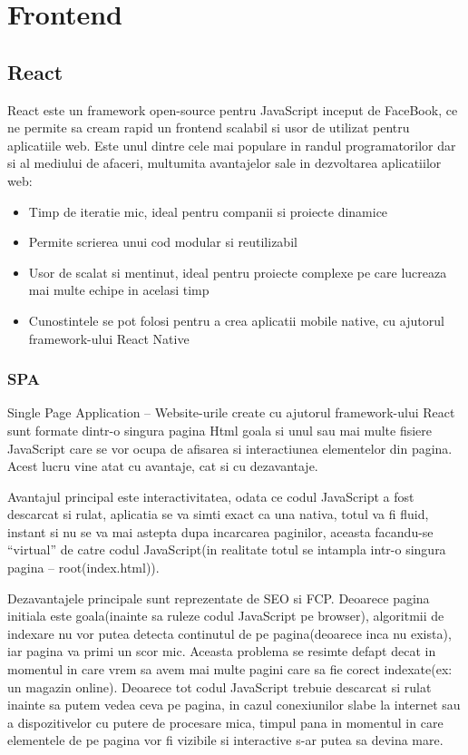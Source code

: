 \documentclass[12pt, a4paper, oneside, romanian]{teza-upb}
\begin{document}
\section{Frontend}

\subsection{React}

React este un framework open-source pentru JavaScript inceput de FaceBook, ce ne permite sa cream rapid un frontend scalabil si usor de utilizat pentru aplicatiile web. Este unul dintre cele mai populare in randul programatorilor dar si al mediului de afaceri, multumita avantajelor sale in dezvoltarea aplicatiilor web\cite{rowebreact}:

\begin{itemize}
	\item Timp de iteratie mic, ideal pentru companii si proiecte dinamice
	\item Permite scrierea unui cod modular si reutilizabil
	\item Usor de scalat si mentinut, ideal pentru proiecte complexe pe care lucreaza mai multe echipe in acelasi timp
	\item Cunostintele se pot folosi pentru a crea aplicatii mobile native, cu ajutorul framework-ului React Native
\end{itemize}

\subsubsection{SPA}

Single Page Application -- Website-urile create cu ajutorul framework-ului React sunt formate dintr-o singura pagina Html goala si unul sau mai multe fisiere JavaScript care se vor ocupa de afisarea si interactiunea elementelor din pagina. Acest lucru vine atat cu avantaje, cat si cu dezavantaje.

Avantajul principal este interactivitatea, odata ce codul JavaScript a fost descarcat si rulat, aplicatia se va simti exact ca una nativa, totul va fi fluid, instant si nu se va mai astepta dupa incarcarea paginilor, aceasta facandu-se ``virtual'' de catre codul JavaScript(in realitate totul se intampla intr-o singura pagina -- root(index.html)).

Dezavantajele principale sunt reprezentate de SEO si FCP. Deoarece pagina initiala este goala(inainte sa ruleze codul JavaScript pe browser), algoritmii de indexare nu vor putea detecta continutul de pe pagina(deoarece inca nu exista), iar pagina va primi un scor mic. Aceasta problema se resimte defapt decat in momentul in care vrem sa avem mai multe pagini care sa fie corect indexate(ex: un magazin online). Deoarece tot codul JavaScript trebuie descarcat si rulat inainte sa putem vedea ceva pe pagina, in cazul conexiunilor slabe la internet sau a dispozitivelor cu putere de procesare mica, timpul pana in momentul in care elementele de pe pagina vor fi vizibile si interactive s-ar putea sa devina mare.
\end{document}
